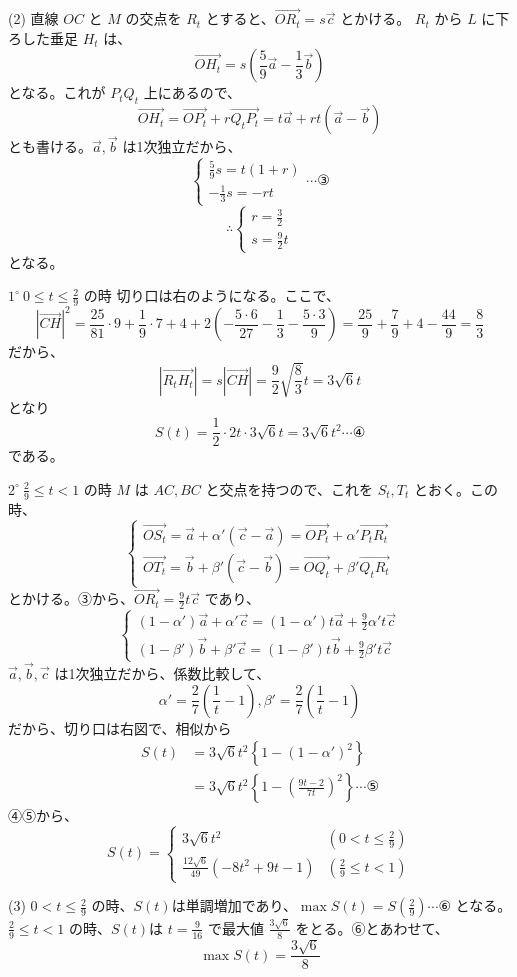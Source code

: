 \documentclass[../main.tex]{subfiles}
\begin{document}
(2) 直線 $OC$ と $M$ の交点を $R_t$ とすると、$\vec{OR_t} = s \vec{c}$ とかける。
$R_t$ から $L$ に下ろした垂足 $H_t$ は、
\[ \vec{OH_t} = s \left( \frac{5}{9}\vec{a} - \frac{1}{3}\vec{b} \right) \]
となる。これが $P_t Q_t$ 上にあるので、
\[ \vec{OH_t} = \vec{OP_t} + r \vec{Q_t P_t} = t \vec{a} + r t (\vec{a} - \vec{b}) \]
とも書ける。$\vec{a}, \vec{b}$ は1次独立だから、
\[
  \begin{cases} \frac{5}{9} s = t (1+r) \\ -\frac{1}{3} s = -rt
\end{cases} \cdots \text{③} \]
\[ \therefore
  \begin{cases} r = \frac{3}{2} \\ s = \frac{9}{2} t
\end{cases} \]
となる。

$1^\circ \ 0 \le t \le \frac{2}{9}$ の時
切り口は右のようになる。ここで、
\[ |\vec{CH}|^2 = \frac{25}{81}\cdot 9 + \frac{1}{9}\cdot 7 + 4 + 2\left(-\frac{5\cdot 6}{27} - \frac{1}{3} - \frac{5\cdot 3}{9}\right) = \frac{25}{9} + \frac{7}{9} + 4 - \frac{44}{9} = \frac{8}{3} \]
だから、
\[ |\vec{R_t H_t}| = s |\vec{CH}| = \frac{9}{2}\sqrt{\frac{8}{3}} t = 3\sqrt{6}t \]
となり
\[ S(t) = \frac{1}{2} \cdot 2t \cdot 3\sqrt{6}t = 3\sqrt{6}t^2 \cdots \text{④} \]
である。

$2^\circ \ \frac{2}{9} \le t < 1$ の時
$M$ は $AC, BC$ と交点を持つので、これを $S_t, T_t$ とおく。この時、
\[
  \begin{cases} \vec{OS_t} = \vec{a} + \alpha' (\vec{c} - \vec{a}) = \vec{OP_t} + \alpha' \vec{P_t R_t} \\ \vec{OT_t} = \vec{b} + \beta' (\vec{c} - \vec{b}) = \vec{OQ_t} + \beta' \vec{Q_t R_t}
\end{cases} \]
とかける。③から、$\vec{OR_t} = \frac{9}{2} t \vec{c}$ であり、
\[
  \begin{cases} (1-\alpha')\vec{a} + \alpha'\vec{c} = (1-\alpha') t \vec{a} + \frac{9}{2}\alpha' t \vec{c} \\ (1-\beta')\vec{b} + \beta'\vec{c} = (1-\beta') t \vec{b} + \frac{9}{2}\beta' t \vec{c}
\end{cases} \]
$\vec{a}, \vec{b}, \vec{c}$ は1次独立だから、係数比較して、
\[ \alpha' = \frac{2}{7}\left(\frac{1}{t}-1\right), \beta' = \frac{2}{7}\left(\frac{1}{t}-1\right) \]
だから、切り口は右図で、相似から
\begin{align*}
  S(t) &= 3\sqrt{6}t^2 \left\{ 1 - (1-\alpha')^2 \right\} \\
  &= 3\sqrt{6}t^2 \left\{ 1 - \left( \frac{9t-2}{7t} \right)^2 \right\} \cdots \text{⑤}
\end{align*}
④⑤から、
\[ S(t) =
  \begin{cases} 3\sqrt{6}t^2 & \left(0 < t \le \frac{2}{9}\right) \\ \frac{12\sqrt{6}}{49}(-8t^2+9t-1) & \left(\frac{2}{9} \le t < 1\right)
\end{cases} \]

(3) $0 < t \le \frac{2}{9}$ の時、$S(t)$は単調増加であり、$\max S(t) = S\left(\frac{2}{9}\right) \cdots \text{⑥}$ となる。
$\frac{2}{9} \le t < 1$ の時、$S(t)$は $t = \frac{9}{16}$ で最大値 $\frac{3\sqrt{6}}{8}$ をとる。⑥とあわせて、
\[ \max S(t) = \frac{3\sqrt{6}}{8} \]
\end{document}
